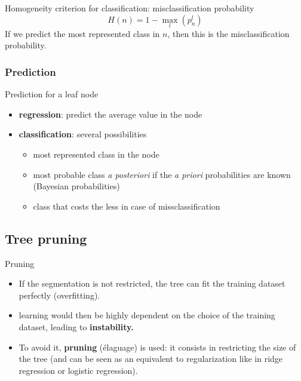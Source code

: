 \documentclass[usenames,dvipsnames]{beamer}
\begin{document}
\begin{frame}{Homogeneity criterion for classification: misclassification probability}
    \begin{equation}
	H(n) = 1-  \max_l(p_n^l)
    \end{equation}
    If we predict the most represented class in $n$, then this is the misclassification probability.
\end{frame}

\subsubsection{Prediction}%
\label{ssub:prediction}

\begin{frame}{Prediction for a leaf node}
    \begin{itemize}
        \item \textbf{{regression}}: predict the average value in the node
	\item \textbf{{classification}}: several possibilities
	    \begin{itemize}
	        \item most represented class in the node
		\item most probable class \textit{{a posteriori}} if the \textit{{a priori}} probabilities are known (Bayesian probabilities) 
		\item class that costs the less in case of missclassification
	    \end{itemize}
    \end{itemize}
\end{frame}


\subsection{Tree pruning}%
\label{sub:pruning}

\begin{frame}{Pruning}
    \begin{itemize}
	\item If the segmentation is not restricted, the tree can fit the training dataset perfectly (overfitting).
        \item learning would then be highly dependent on the choice of the training dataset, leading to \textbf{{instability.}} 
	\item To avoid it, \textbf{{pruning}} (élaguage) is used: it consists in restricting the size of the tree (and can be seen as an equivalent to regularization like in ridge regression or logistic regression). 
    \end{itemize}
\end{frame}
\end{document}
